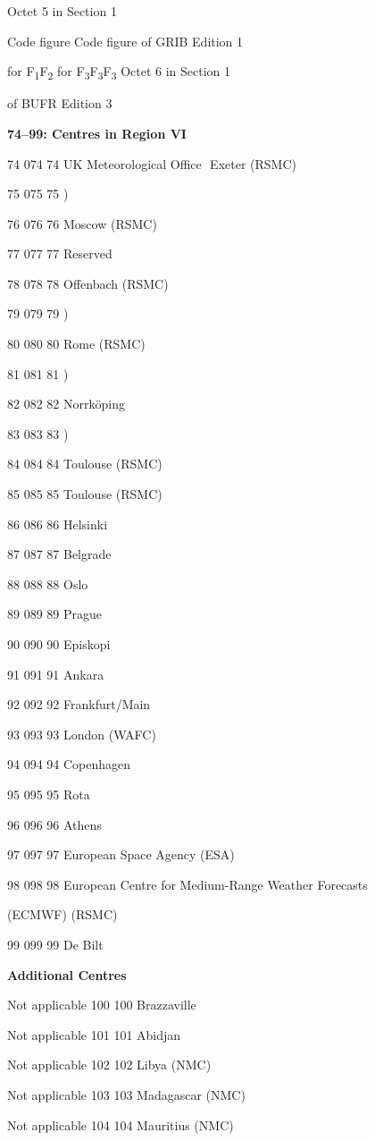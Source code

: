 Octet 5 in Section 1

Code figure Code figure of GRIB Edition 1

for F\textsubscript{1}F\textsubscript{2} for F\textsubscript{3}F\textsubscript{3}F\textsubscript{3} Octet 6 in Section 1

of BUFR Edition 3

\textbf{74--99: Centres in Region VI}

74 074 74 UK Meteorological Office ­ Exeter (RSMC)

75 075 75 )

76 076 76 Moscow (RSMC)

77 077 77 Reserved

78 078 78 Offenbach (RSMC)

79 079 79 )

80 080 80 Rome (RSMC)

81 081 81 )

82 082 82 Norrköping

83 083 83 )

84 084 84 Toulouse (RSMC)

85 085 85 Toulouse (RSMC)

86 086 86 Helsinki

87 087 87 Belgrade

88 088 88 Oslo

89 089 89 Prague

90 090 90 Episkopi

91 091 91 Ankara

92 092 92 Frankfurt/Main

93 093 93 London (WAFC)

94 094 94 Copenhagen

95 095 95 Rota

96 096 96 Athens

97 097 97 European Space Agency (ESA)

98 098 98 European Centre for Medium-Range Weather Forecasts

(ECMWF) (RSMC)

99 099 99 De Bilt

\textbf{Additional Centres}

Not applicable 100 100 Brazzaville

Not applicable 101 101 Abidjan

Not applicable 102 102 Libya (NMC)

Not applicable 103 103 Madagascar (NMC)

Not applicable 104 104 Mauritius (NMC)

